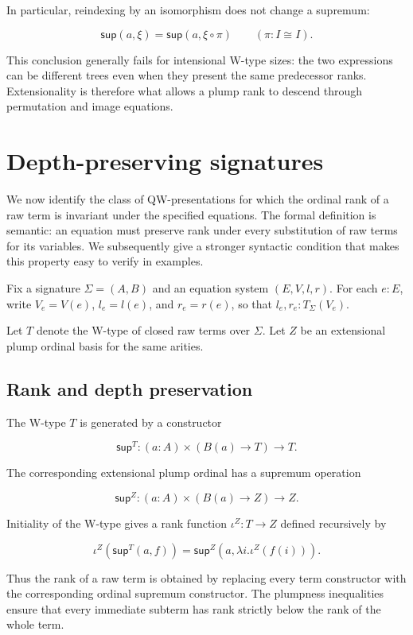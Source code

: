 \documentclass[runningheads]{llncs}
\begin{document}
In particular, reindexing by an isomorphism does not change a supremum:

\[
\mathsf{sup} (a,\xi) = \mathsf{sup} (a,\xi\circ\pi)
\qquad (\pi:I\cong I).
\]

This conclusion generally fails for intensional
W-type sizes: the two expressions can be different trees even when they
present the same predecessor ranks. Extensionality is therefore what
allows a plump rank to descend through permutation and image equations.

\section{Depth-preserving
signatures}\label{depth-preserving-signatures}

We now identify the class of QW-presentations for which the ordinal rank
of a raw term is invariant under the specified equations. The formal
definition is semantic: an equation must preserve rank under every
substitution of raw terms for its variables. We subsequently give a
stronger syntactic condition that makes this property easy to verify in
examples.

Fix a signature \(\Sigma=(A,B)\) and an equation system \((E,V,l,r)\).
For each \(e:E\), write \(V_e=V(e)\), \(l_e=l(e)\), and
\(r_e=r(e)\), so that \(l_e,r_e:T_\Sigma (V_e).\)

Let \(T\) denote the W-type of closed raw terms over \(\Sigma\). Let
\(Z\) be an extensional plump ordinal basis for the same arities.

\subsection{Rank and depth preservation}\label{rank-and-depth-preservation}

The W-type \(T\) is generated by a constructor

\[
\mathsf{sup}^T: (a:A)\times (B (a)\to T) \to T.
\]

The corresponding extensional plump ordinal has a supremum operation

\[
\mathsf{sup}^Z: (a:A)\times (B (a)\to Z) \to Z.
\]

Initiality of the W-type gives a rank function \(\iota^Z:T\to Z\)
defined recursively by

\[
\iota^Z \left(\mathsf{sup}^T (a,f)\right)
=
\mathsf{sup}^Z \left(a,\lambda i.\iota^Z (f (i))\right).
\]

Thus the rank of a raw term is obtained by replacing every term
constructor with the corresponding ordinal supremum constructor. The
plumpness inequalities ensure that every immediate subterm has rank
strictly below the rank of the whole term.
\end{document}
